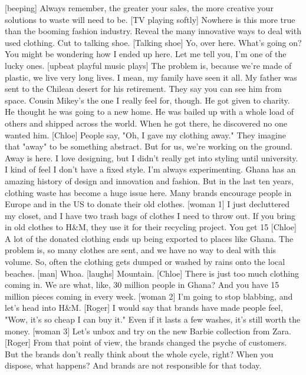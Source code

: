 \documentclass[a4paper]{article}
\begin{document}
	[beeping]
	Always remember, the greater your sales,
	the more creative your solutions to waste will need to be.
	[TV playing softly]
	Nowhere is this more true than the booming fashion industry.
	Reveal the many innovative ways to deal with used clothing.
	Cut to talking shoe.
	[Talking shoe] Yo, over here.
	What's going on?
	You might be wondering how I ended up here.
	Let me tell you, I'm one of the lucky ones.
	[upbeat playful music plays]
	The problem is, because we're made of plastic,
	we live very long lives.
	I mean, my family have seen it all.
	My father was sent to the Chilean desert for his retirement.
	They say you can see him from space.
	Cousin Mikey's the one I really feel for, though.
	He got given to charity.
	He thought he was going to a new home.
	He was bailed up with a whole load of others and shipped across the world.
	When he got there,
	he discovered no one wanted him.
	[Chloe] People say, "Oh, I gave my clothing away."
	They imagine that "away" to be something abstract.
	But for us, we're working on the ground.
	Away is here.
	I love designing, but I didn't really get into styling until university.
	I kind of feel I don't have a fixed style. I'm always experimenting.
	Ghana has an amazing history of design and innovation and fashion.
	But in the last ten years, clothing waste has become a huge issue here.
	Many brands encourage people in Europe and in the US to donate their old clothes.
	[woman 1] I just decluttered my closet,
	and I have two trash bags of clothes I need to throw out.
	If you bring in old clothes to H\&M, they use it for their recycling project.
	You get 15%
	[Chloe] A lot of the donated clothing ends up being exported to places like Ghana.
	The problem is, so many clothes are sent,
	and we have no way to deal with this volume.
	So, often the clothing gets dumped or washed by rains
	onto the local beaches.
	[man] Whoa.
	[laughs]
	Mountain.
	[Chloe] There is just too much clothing coming in.
	We are what, like, 30 million people in Ghana?
	And you have 15 million pieces coming in every week.
	[woman 2] I'm going to stop blabbing, and let's head into H\&M.
	[Roger] I would say that brands have made people feel,
	"Wow, it's so cheap I can buy it."
	Even if it lasts a few washes, it's still worth the money.
	[woman 3] Let's unbox and try on the new Barbie collection from Zara.
	[Roger] From that point of view, the brands changed the psyche of customers.
	But the brands don't really think about the whole cycle, right?
	When you dispose, what happens?
	And brands are not responsible for that today.
\end{document}
